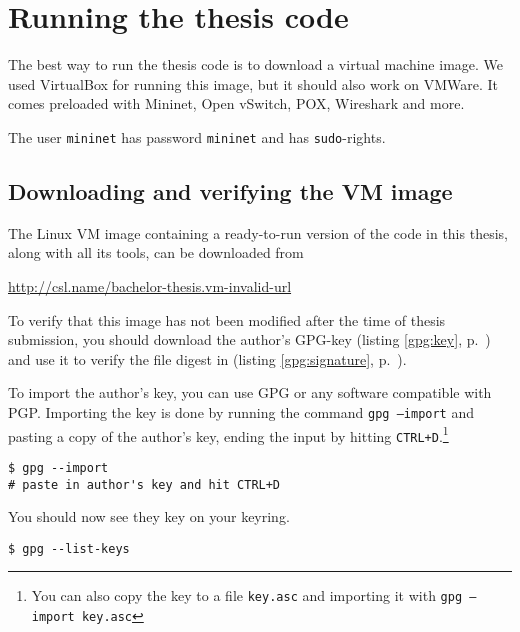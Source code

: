 \chapter{Running the thesis code}
\label{chapter:install.vm}

The best way to run the thesis code is to download a virtual machine image.
We used VirtualBox for running this image, but it should
also work on VMWare.  It comes preloaded with
Mininet, Open vSwitch, POX,
  Wireshark and more.

The user \texttt{mininet} has password \texttt{mininet} and has
\texttt{sudo}-rights.

\section{Downloading and verifying the VM image}

The Linux VM image containing a ready-to-run version of the
code in this thesis, along with all its tools, can be downloaded from
%
\begin{center}
  \href{http://csl.name/bachelor-thesis.vm-invalid-url}{http://csl.name/bachelor-thesis.vm-invalid-url}
  \label{gpg:url}
\end{center}

To verify that this image has not been modified after the time of thesis
submission, you should download the author's GPG-key (listing
\ref{gpg:key}, p.~\pageref{gpg:key}) and use it to verify the file digest
in (listing \ref{gpg:signature}, p.~\pageref{gpg:signature}).

To import the author's key, you can use \ac{GPG} or any software compatible
with PGP.  Importing the key is done by running the command
\texttt{gpg --import} and pasting a copy of the author's key, ending the
input by hitting \texttt{CTRL+D}.\footnote{You can also copy the key to a
  file \texttt{key.asc} and importing it with \texttt{gpg --import key.asc}}

\begin{Verbatim}
$ gpg --import
# paste in author's key and hit CTRL+D
\end{Verbatim}

You should now see they key on your keyring.

\begin{Verbatim}
$ gpg --list-keys
\end{Verbatim}

